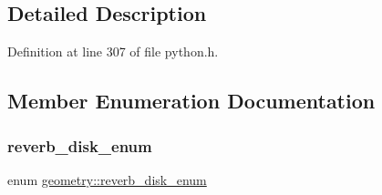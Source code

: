 \subsection{Detailed Description}


Definition at line 307 of file python.\+h.



\subsection{Member Enumeration Documentation}
\mbox{\label{structgeometry_a38a806db00f0535995ab885e461ea7e5}} 
\subsubsection{\texorpdfstring{reverb\+\_\+disk\+\_\+enum}{reverb\_disk\_enum}}
{\footnotesize\ttfamily enum \hyperlink{structgeometry_a38a806db00f0535995ab885e461ea7e5}{geometry\+::reverb\+\_\+disk\+\_\+enum}}

